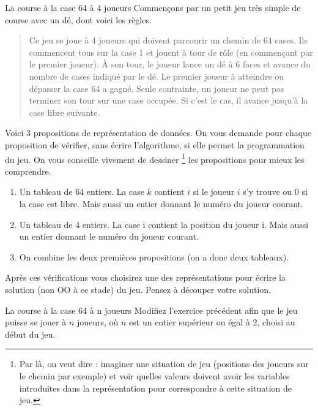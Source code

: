 \begin{Exercice}{La course à la case 64 à 4 joueurs}
	Commençons par un petit jeu très simple de course avec un dé, dont voici les règles.
	
	\begin{quote}
	\og Ce jeu se joue à 4 joueurs qui doivent parcourir un chemin de 64 cases.
	Ils commencent tous sur la case 1 et jouent à tour de rôle
	(en commençant par le premier joueur).
	À son tour, le joueur lance un dé à 6 faces 
	et avance du nombre de cases indiqué par le dé.
	Le premier joueur à atteindre ou dépasser la case 64 a gagné.
	Seule contrainte, un joueur ne peut pas terminer son tour
	sur une case occupée. 
	Si c'est le cas, il avance jusqu'à la case libre suivante.\fg
	\end{quote}
	
	Voici 3 propositions de représentation de données. 
	On vous demande pour chaque proposition de vérifier, 
	sans écrire l'algorithme, si elle permet la programmation du jeu. 
	On vous conseille vivement de \og{}dessiner\fg{}%
	\footnote{
		Par là, on veut dire : imaginer une situation de jeu
		(positions des joueurs sur le chemin par exemple)
		et voir quelles valeurs doivent avoir les variables
		introduites dans la représentation pour correspondre
		à cette situation de jeu. 
	} les propositions
	pour mieux les comprendre.
	
	\begin{enumerate}
	\item 
		Un tableau de 64 entiers.
		La case $k$ contient $i$ si le joueur $i$ s'y trouve 
		ou $0$ si la case est libre.
		Mais aussi un entier  donnant
		le numéro du joueur courant.
	\item
		Un tableau de 4 entiers. 
		La case i contient la position du joueur i.
		Mais aussi un entier  donnant
		le numéro du joueur courant.
	\item
		On combine les deux premières propositions
		(on a donc deux tableaux).
	\end{enumerate}

	Après ces vérifications vous choisirez une des représentations 
	pour écrire la solution (non OO à ce stade) du jeu.
	Pensez à découper votre solution.
	
\end{Exercice}

\begin{Exercice}{La course à la case 64 à n joueurs}
	Modifiez l'exercice précédent 
	afin que le jeu puisse se jouer à $n$ joueurs,
	où $n$ est un entier supérieur ou égal à 2, choisi au début du jeu.
\end{Exercice}
	
